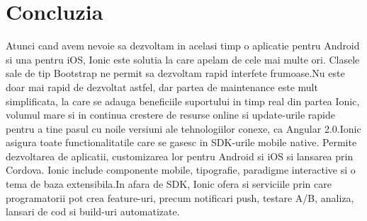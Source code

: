 \documentclass[12pt]{article}
\begin{document}
\section*{Concluzia}
Atunci cand avem nevoie sa dezvoltam in acelasi timp o aplicatie pentru Android si una pentru iOS, Ionic este solutia la care apelam de cele mai multe ori. Clasele sale de tip Bootstrap ne permit sa dezvoltam rapid interfete frumoase.Nu este doar mai rapid de dezvoltat astfel, dar partea de maintenance este mult simplificata, la care se adauga beneficiile suportului in timp real din partea Ionic, volumul mare si in continua crestere de resurse online si update-urile rapide pentru a tine pasul cu noile versiuni ale tehnologiilor conexe, ca Angular 2.0.Ionic asigura toate functionalitatile care se gasesc in SDK-urile mobile native. Permite dezvoltarea de aplicatii, customizarea lor pentru Android si iOS si lansarea prin Cordova. Ionic include componente mobile, tipografie, paradigme interactive si o tema de baza extensibila.In afara de SDK, Ionic ofera si serviciile prin care programatorii pot crea feature-uri, precum notificari push, testare A/B, analiza, lansari de cod si build-uri automatizate.
\end{document}
